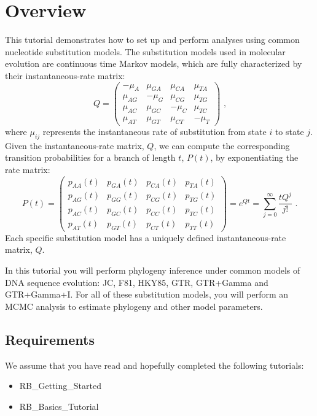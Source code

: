 \section{Overview}


This tutorial demonstrates how to set up and perform analyses using common nucleotide substitution models. 
The substitution models used in molecular evolution are continuous time Markov models, which are fully characterized by their instantaneous-rate matrix:
\begin{equation*}
Q = \begin{pmatrix} -\mu_A & \mu_{GA} & \mu_{CA} & \mu_{TA} \\
\mu_{AG} & -\mu_G  & \mu_{CG} & \mu_{TG} \\
\mu_{AC} & \mu_{GC} & -\mu_C  & \mu_{TC} \\
\mu_{AT} & \mu_{GT} & \mu_{CT} & -\mu_T 
\end{pmatrix} \mbox{  ,}
\end{equation*}
where $\mu_{ij}$ represents the instantaneous rate of substitution from state $i$ to state $j$. Given the instantaneous-rate matrix, $Q$, we can compute the corresponding transition probabilities for a branch of length $t$, $P(t)$, by exponentiating the rate matrix:
\begin{equation*}
P(t) = \begin{pmatrix}          
p_{AA}(t) & p_{GA}(t) & p_{CA}(t) & p_{TA}(t) \\
p_{AG}(t) & p_{GG}(t) & p_{CG}(t) & p_{TG}(t) \\
p_{AC}(t) & p_{GC}(t) & p_{CC}(t) & p_{TC}(t) \\
p_{AT}(t) & p_{GT}(t) & p_{CT}(t) & p_{TT}(t)
\end{pmatrix} = e^{Qt} = \sum_{j=0}^\infty\frac{tQ^j}{j!} \mbox{  .}
\end{equation*}
Each specific substitution model has a uniquely defined instantaneous-rate matrix, $Q$.


In this tutorial you will perform phylogeny inference under common models of DNA sequence evolution: JC, F81, HKY85, GTR, GTR+Gamma and GTR+Gamma+I.
For all of these substitution models, you will perform an MCMC analysis to estimate phylogeny and other model parameters.

\subsection*{Requirements}
We assume that you have read and hopefully completed the following tutorials:
\begin{itemize}
\item RB\_Getting\_Started
\item RB\_Basics\_Tutorial
\end{itemize}



